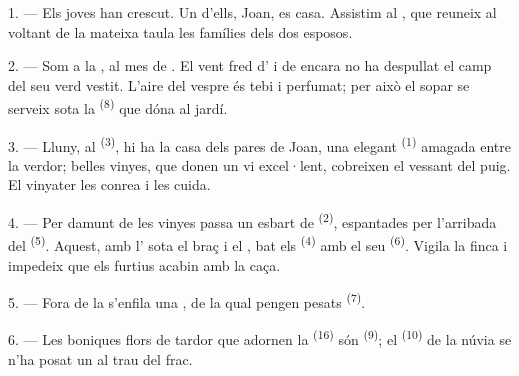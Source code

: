 
\VUsaut{4.0mm}
\VUsaut{1.6mm}
\VUsaut{3.2mm}

\VUsaut{1.6mm}
\VUsaut{2.6mm}

\VUsaut{3.0mm}

1. --- Els joves han crescut. Un d'ells, Joan, es casa. Assistim al
, que reuneix al voltant de la mateixa taula les
famílies dels dos esposos.

2. --- Som a la , al mes de . El vent fred d'
i de  encara no ha despullat el camp del seu verd vestit. L'aire del vespre
és tebi i perfumat; per això el sopar se serveix sota la 
\textsuperscript{(8)} que dóna al jardí.

3. --- Lluny, al  \textsuperscript{(3)}, hi ha la casa dels pares de Joan, una
elegant  \textsuperscript{(1)} amagada entre la verdor; belles vinyes,
que donen un vi excel·lent, cobreixen el vessant del puig. El vinyater les conrea i les cuida.

4. --- Per damunt de les vinyes passa un esbart de  \textsuperscript{(2)},
espantades per l'arribada del  \textsuperscript{(5)}. Aquest, amb
l' sota el braç i el
, bat els  \textsuperscript{(4)} amb el
seu  \textsuperscript{(6)}. Vigila la finca i impedeix que els furtius acabin amb
la caça.

5. --- Fora de la  s'enfila una , de la qual pengen pesats
 \textsuperscript{(7)}.

6. --- Les boniques flors de tardor que adornen la  \textsuperscript{(16)} són
 \textsuperscript{(9)}; el
 \textsuperscript{(10)} de la núvia se n'ha posat un al trau del frac.

